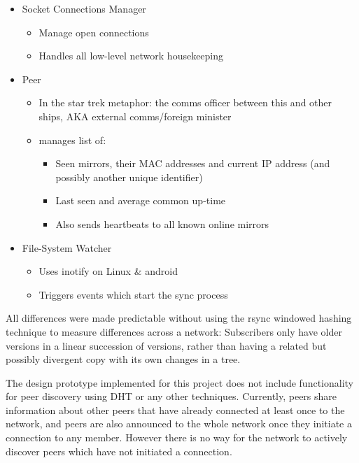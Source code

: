 \documentclass[12pt,a4paper,]{adreport}
\begin{document}
\begin{itemize}
\itemsep1pt\parskip0pt
\item
  Socket Connections Manager

  \begin{itemize}
  \itemsep1pt\parskip0pt
  \item
    Manage open connections
  \item
    Handles all low-level network housekeeping
  \end{itemize}
\item
  Peer

  \begin{itemize}
  \itemsep1pt\parskip0pt
  \item
    In the star trek metaphor: the comms officer between this and other
    ships, AKA external comms/foreign minister
  \item
    manages list of:

    \begin{itemize}
    \itemsep1pt\parskip0pt
    \item
      Seen mirrors, their MAC addresses and current IP address (and
      possibly another unique identifier)
    \item
      Last seen and average common up-time
    \item
      Also sends heartbeats to all known online mirrors
    \end{itemize}
  \end{itemize}
\item
  File-System Watcher

  \begin{itemize}
  \itemsep1pt\parskip0pt
  \item
    Uses inotify on Linux \& android
  \item
    Triggers events which start the sync process
  \end{itemize}
\end{itemize}

All differences were made predictable without using the rsync windowed
hashing technique to measure differences across a network: Subscribers
only have older versions in a linear succession of versions, rather than
having a related but possibly divergent copy with its own changes in a
tree.

The design prototype implemented for this project does not include
functionality for peer discovery using DHT or any other techniques.
Currently, peers share information about other peers that have already
connected at least once to the network, and peers are also announced to
the whole network once they initiate a connection to any member. However
there is no way for the network to actively discover peers which have
not initiated a connection.
\end{document}
